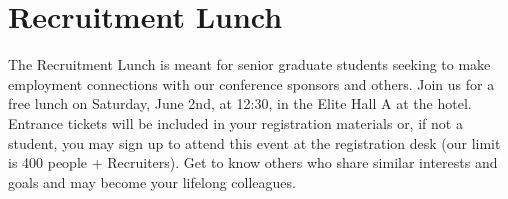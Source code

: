 \clearpage
\section[Recruitment Lunch]{Recruitment Lunch}
\setheaders{}{\daydateyear}


\noindent The Recruitment Lunch is meant for senior graduate students seeking to make employment connections with our conference sponsors and others.  Join us for a free lunch on Saturday, June 2nd, at 12:30, in the Elite Hall A at the hotel. Entrance tickets will be included in your registration materials or, if not a student, you may sign up to attend this event at the registration desk (our limit is 400 people + Recruiters). Get to know others who share similar interests and goals and may become your lifelong colleagues.
